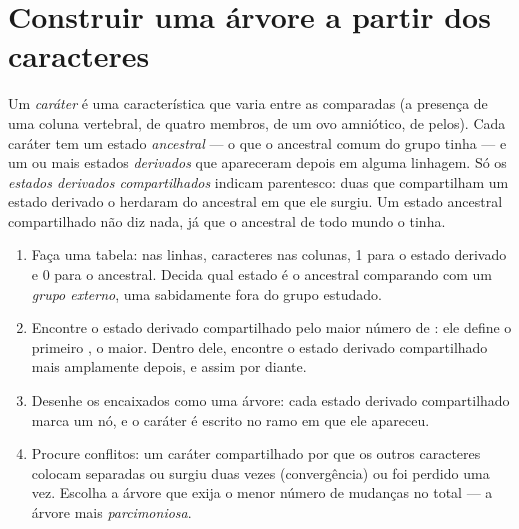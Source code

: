\section{Construir uma árvore a partir dos caracteres}

\begin{definition}\label{def:g12:phylogenetic-trees:states}
Um \emph{caráter} é uma característica que varia entre as 
comparadas (a presença de uma coluna vertebral, de quatro membros, de
um ovo amniótico, de pelos). Cada caráter tem um estado
\emph{ancestral} --- o que o ancestral comum do grupo tinha --- e um ou
mais estados \emph{derivados} que apareceram depois em alguma linhagem.
Só os \emph{estados derivados compartilhados} indicam parentesco: duas
 que compartilham um estado derivado o herdaram do ancestral em
que ele surgiu. Um estado ancestral compartilhado não diz nada, já que
o ancestral de todo mundo o tinha.
\end{definition}

\begin{method}\label{met:g12:phylogenetic-trees:build}
\begin{enumerate}
  \item Faça uma tabela:  nas linhas, caracteres nas colunas, 1
        para o estado derivado e 0 para o ancestral. Decida qual estado
        é o ancestral comparando com um \emph{grupo externo}, uma
         sabidamente fora do grupo estudado.
  \item Encontre o estado derivado compartilhado pelo maior número de
        : ele define o primeiro , o maior. Dentro dele,
        encontre o estado derivado compartilhado mais amplamente
        depois, e assim por diante.
  \item Desenhe os  encaixados como uma árvore: cada estado
        derivado compartilhado marca um nó, e o caráter é escrito no
        ramo em que ele apareceu.
  \item Procure conflitos: um caráter compartilhado por  que os
        outros caracteres colocam separadas ou surgiu duas vezes
        (convergência) ou foi perdido uma vez. Escolha a árvore que
        exija o menor número de mudanças no total --- a árvore mais
        \emph{parcimoniosa}.
\end{enumerate}
\end{method}

